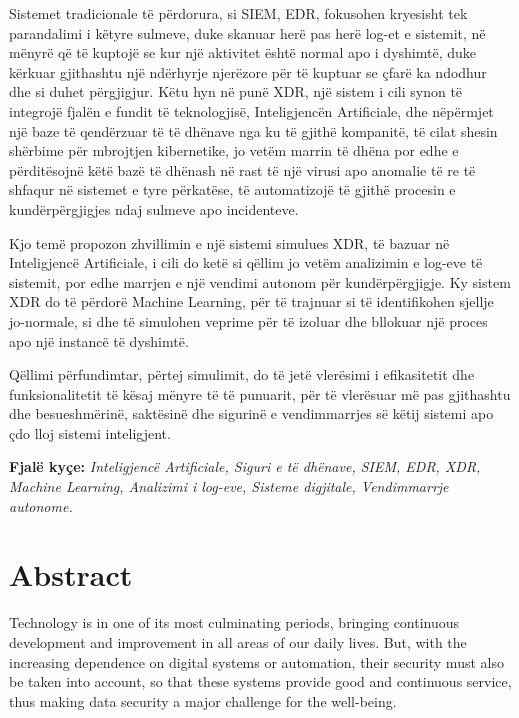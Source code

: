 \documentclass[12pt,a4paper]{report}
\begin{document}
Sistemet tradicionale të përdorura, si SIEM, EDR, fokusohen kryesisht tek parandalimi i këtyre
sulmeve, duke skanuar herë pas herë log-et e sistemit, në mënyrë që të kuptojë se kur një
aktivitet është normal apo i dyshimtë, duke kërkuar gjithashtu një ndërhyrje njerëzore për të
kuptuar se çfarë ka ndodhur dhe si duhet përgjigjur. Këtu hyn në punë XDR, një sistem i cili
synon të integrojë fjalën e fundit të teknologjisë, Inteligjencën Artificiale, dhe nëpërmjet një
baze të qendërzuar të të dhënave nga ku të gjithë kompanitë, të cilat shesin shërbime për
mbrojtjen kibernetike, jo vetëm marrin të dhëna por edhe e përditësojnë këtë bazë të dhënash
në rast të një virusi apo anomalie të re të shfaqur në sistemet e tyre përkatëse, të automatizojë
të gjithë procesin e kundërpërgjigjes ndaj sulmeve apo incidenteve.

Kjo temë propozon zhvillimin e një sistemi simulues XDR, të bazuar në Inteligjencë Artificiale,
i cili do ketë si qëllim jo vetëm analizimin e log-eve të sistemit, por edhe marrjen e një
vendimi autonom për kundërpërgjigje. Ky sistem XDR do të përdorë Machine Learning, për të
trajnuar si të identifikohen sjellje jo-normale, si dhe të simulohen veprime për të izoluar dhe
bllokuar një proces apo një instancë të dyshimtë.

Qëllimi përfundimtar, përtej simulimit, do të jetë vlerësimi i efikasitetit dhe funksionalitetit të
kësaj mënyre të të punuarit, për të vlerësuar më pas gjithashtu dhe besueshmërinë, saktësinë
dhe sigurinë e vendimmarrjes së këtij sistemi apo çdo lloj sistemi inteligjent.

\medskip
\noindent\textbf{Fjalë kyçe:} \textit{Inteligjencë Artificiale, Siguri e të dhënave, SIEM, EDR,
XDR, Machine Learning, Analizimi i log-eve, Sisteme digjitale, Vendimmarrje autonome.}

\chapter*{Abstract}

Technology is in one of its most culminating periods, bringing continuous development and
improvement in all areas of our daily lives. But, with the increasing dependence on digital
systems or automation, their security must also be taken into account, so that these systems
provide good and continuous service, thus making data security a major challenge for the
well-being.
\end{document}
